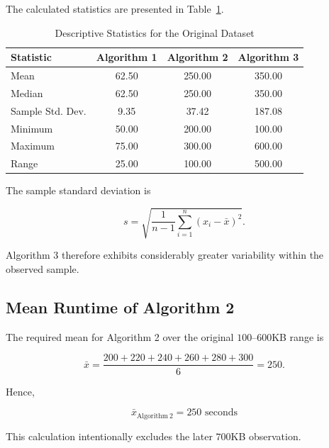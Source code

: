 \documentclass[11pt,a4paper]{article}
\begin{document}
The calculated statistics are presented in
Table~\ref{tab:statistics}.

\begin{table}[H]
\centering
\caption{Descriptive Statistics for the Original Dataset}
\label{tab:statistics}

\begin{tabular}{l|ccc}
\toprule
\textbf{Statistic}
& \textbf{Algorithm 1}
& \textbf{Algorithm 2}
& \textbf{Algorithm 3} \\
\midrule
Mean & 62.50 & 250.00 & 350.00 \\
Median & 62.50 & 250.00 & 350.00 \\
Sample Std. Dev. & 9.35 & 37.42 & 187.08 \\
Minimum & 50.00 & 200.00 & 100.00 \\
Maximum & 75.00 & 300.00 & 600.00 \\
Range & 25.00 & 100.00 & 500.00 \\
\bottomrule
\end{tabular}
\end{table}

The sample standard deviation is

\[
s=
\sqrt{
\frac{1}{n-1}
\sum_{i=1}^{n}
(x_i-\bar{x})^2
}.
\]

Algorithm 3 therefore exhibits considerably greater variability within the
observed sample.


\subsection{Mean Runtime of Algorithm 2}

The required mean for Algorithm 2 over the original $100$--$600$KB range
is

\[
\bar{x}
=
\frac{
200+220+240+260+280+300
}{6}
=
250.
\]

Hence,

\begin{resultbox}
\[
\boxed{
\bar{x}_{\mathrm{Algorithm\ 2}}
=
250\text{ seconds}
}
\]
\end{resultbox}

This calculation intentionally excludes the later $700$KB observation.

\end{document}
